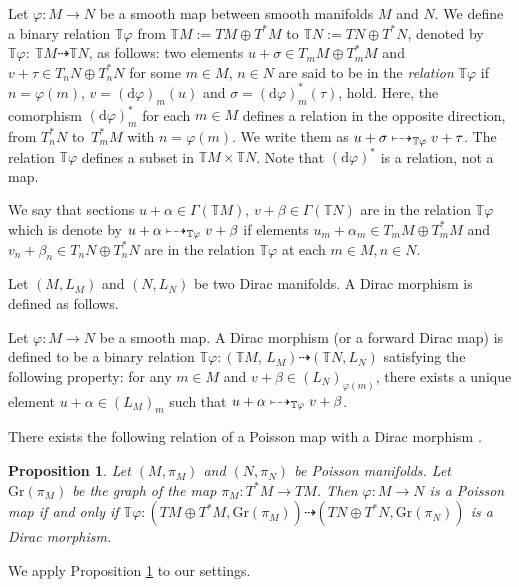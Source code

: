 \documentclass[10pt,a4paper]{amsart}
\numberwithin{equation}{section}
\newtheorem{Proposition}[Theorem]{Proposition}
 { \theoremstyle{definition}
\newtheorem{Definition}[Theorem]{Definition}
\newtheorem{Note}[Theorem]{Note}
\newtheorem{Example}[Theorem]{Example}
\newtheorem{Remark}[Theorem]{Remark}
\newtheorem{Question}[Theorem]{Question}
 }
\newcommand{\bbT}{{\mathbb{T}}}
\begin{document}
Let $\varphi\colon M\to N$ be a smooth map between smooth manifolds $M$ and $N$.
We define a binary relation $\mathbb{T}\varphi$ from $\mathbb{T}M:=TM\oplus T^*M$ to $\mathbb{T}N:=TN\oplus T^*N$, denoted by
$
\mathbb{T}\varphi \colon\ \mathbb{T}M \dashrightarrow \mathbb{T}N$,
as follows:
two elements $u+\sigma \in T_mM\oplus T_m^*M$ and $v+\tau \in T_nN\oplus T^*_nN$ for some $m\in M$, $n\in N$ are said to be in the \textit{relation} $\mathbb{T}\varphi$
if
$
n=\varphi(m)$, $ v=(\mathrm{d}\varphi)_m(u)$ and $ \sigma = (\mathrm{d}\varphi)_m^*(\tau)$,
hold. Here, the comorphism $(\mathrm{d}\varphi)_m^*$ for each $m\in M$ defines a relation in the opposite direction, from $T_n^*N$ to~$T_m^*M$ with $n=\varphi(m)$.
We write them as $u+\sigma\mapstochar\dashrightarrow_{\mathbb{T}\varphi} v+\tau$. The relation $\mathbb{T}\varphi$ defines a subset in $\mathbb{T}M\times \mathbb{T}N$.
Note that $(\mathrm{d}\varphi)^*$ is a relation, not a map.

We say that sections $u+\alpha \in \Gamma(\mathbb{T}M),\,v+\beta\in \Gamma(\mathbb{T}N)$ are in the relation $\mathbb{T}\varphi$ which is denote by
$u+\alpha\mapstochar\dashrightarrow_{\mathbb{T}\varphi} v+\beta$ if elements $u_m+\alpha_m\in T_mM\oplus T_m^*M$ and $v_n+\beta_n\in T_nN\oplus T_n^*N$ are in the relation $\mathbb{T}\varphi$ at each $m\in M, n\in N$.

Let $(M,L_M)$ and $(N,L_N)$ be two Dirac manifolds. A Dirac morphism is defined as follows.
\begin{Definition}
Let $\varphi\colon M\to N$ be a smooth map. A Dirac morphism {\rm (}or a forward Dirac map{\rm )} is defined to be a binary relation
$
\mathbb{T}\varphi \colon (\mathbb{T}M,\,L_M)\dashrightarrow (\mathbb{T}N, L_N)
$
satisfying the following property{\rm :} for any $m\in M$ and $v+\beta\in (L_N)_{\varphi(m)}$, there exists a unique element $u+\alpha\in (L_M)_m$ such that
$u+\alpha\mapstochar\dashrightarrow_{\mathbb{T}\varphi} v+\beta$.
\end{Definition}

There exists the following relation of a Poisson map
with a Dirac morphism \cite{Meinrenken02}.
\begin{Proposition}\label{PoissonDirac}
Let $(M, \pi_M)$ and $(N, \pi_N)$ be Poisson manifolds.
Let $\mathrm{Gr}(\pi_M)$ be the graph of the map
$\pi_M\colon T^*M \rightarrow TM$.
Then $\varphi\colon M \rightarrow N$ is a Poisson map if and only if
$\bbT \varphi\colon (TM \oplus T^*M, \mathrm{Gr}(\pi_M))
\dashrightarrow (TN \oplus T^*N, \mathrm{Gr}(\pi_N))$
is a Dirac morphism.
\end{Proposition}
We apply Proposition \ref{PoissonDirac} to our settings.
\end{document}
